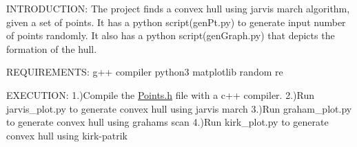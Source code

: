 I\+N\+T\+R\+O\+D\+U\+C\+T\+I\+ON\+: The project finds a convex hull using jarvis march algorithm, given a set of points. It has a python script(gen\+Pt.\+py) to generate input number of points randomly. It also has a python script(gen\+Graph.\+py) that depicts the formation of the hull.

R\+E\+Q\+U\+I\+R\+E\+M\+E\+N\+TS\+: g++ compiler python3 matplotlib random re

E\+X\+E\+C\+U\+T\+I\+ON\+: 1.)Compile the \mbox{\hyperlink{Points_8h_source}{Points.\+h}} file with a c++ compiler. 2.)Run jarvis\+\_\+plot.\+py to generate convex hull using jarvis march 3.)Run graham\+\_\+plot.\+py to generate convex hull using graham\textquotesingle{}s scan 4.)Run kirk\+\_\+plot.\+py to generate convex hull using kirk-\/patrik 
